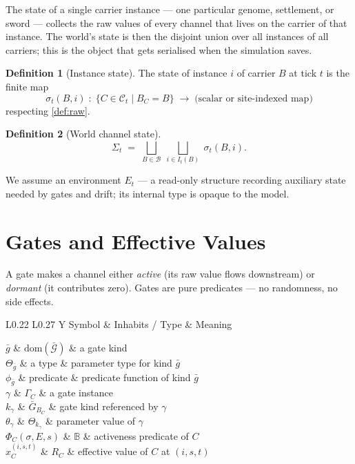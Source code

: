\documentclass[journal,onecolumn,11pt]{IEEEtran}
\theoremstyle{definition}
\newtheorem{definition}{Definition}
\newcommand{\notationtable}[3]{%
  \begin{table}[ht]
  \centering
  \caption{#1}
  \label{#2}
  \small
  \renewcommand{\arraystretch}{1.1}
  \begin{tabularx}{\linewidth}{L{0.22\linewidth} L{0.27\linewidth} Y}
  \toprule
  Symbol & Inhabits / Type & Meaning \\
  \midrule
  #3
  \bottomrule
  \end{tabularx}
  \end{table}%
}
\begin{document}
The state of a single carrier instance --- one particular genome, settlement, or sword --- collects the raw values of every channel that lives on the carrier of that instance. The world's state is then the disjoint union over all instances of all carriers; this is the object that gets serialised when the simulation saves.

\begin{definition}[Instance state]
The state of instance $i$ of carrier $B$ at tick $t$ is the finite map
\[
\sigma_t(B,i) \;:\; \{C \in \mathcal{C}_t \mid B_C = B\} \;\longrightarrow\; \text{(scalar or site-indexed map)}
\]
respecting \cref{def:raw}.
\end{definition}

\begin{definition}[World channel state]
\[
\Sigma_t \;=\; \bigsqcup_{B \in \mathcal{B}}\;\bigsqcup_{i \in I_t(B)}\; \sigma_t(B,i).
\]
\end{definition}

We assume an environment $E_t$ --- a read-only structure recording auxiliary state needed by gates and drift; its internal type is opaque to the model.

\section{Gates and Effective Values}
\label{sec:gates}

A gate makes a channel either \emph{active} (its raw value flows downstream) or \emph{dormant} (it contributes zero). Gates are pure predicates --- no randomness, no side effects.

\notationtable{Symbols introduced in \cref{sec:gates}.}{tab:notation-gates}{
$\bar{g}$                 & $\mathrm{dom}(\bar{\mathcal{G}})$ & a gate kind \\
$\Theta_{\bar{g}}$        & a type                       & parameter type for kind $\bar{g}$ \\
$\phi_{\bar{g}}$          & predicate                    & predicate function of kind $\bar{g}$ \\
$\gamma$                  & $\Gamma_C$                   & a gate instance \\
$k_\gamma$                & $\bar{G}_{B_C}$              & gate kind referenced by $\gamma$ \\
$\theta_\gamma$           & $\Theta_{k_\gamma}$          & parameter value of $\gamma$ \\
$\Phi_C(\sigma, E, s)$    & $\mathbb{B}$                 & activeness predicate of $C$ \\
$\hat{x}_C^{(i,s,t)}$     & $R_C$                        & effective value of $C$ at $(i,s,t)$ \\
}
\end{document}
